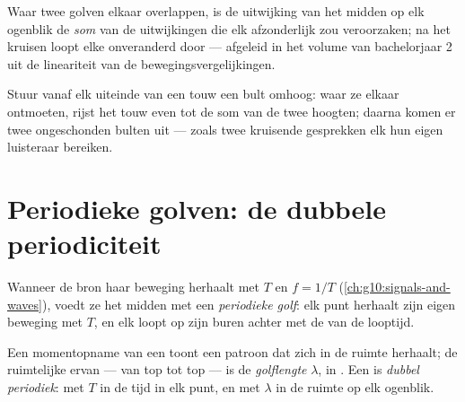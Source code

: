 \begin{proposition}\label{prop:g12:mechanical-waves:superposition}
Waar twee golven elkaar overlappen, is de uitwijking van het midden op elk
ogenblik de \emph{som} van de uitwijkingen die elk afzonderlijk zou
veroorzaken; na het kruisen loopt elke  onveranderd door --- afgeleid
in het volume van bachelorjaar 2 uit de lineariteit van de
bewegingsvergelijkingen. \admitted
\end{proposition}

\begin{example}\label{ex:g12:mechanical-waves:crossing}
Stuur vanaf elk uiteinde van een touw een bult omhoog: waar ze elkaar
ontmoeten, rijst het touw even tot de som van de twee hoogten; daarna
komen er twee ongeschonden bulten uit --- zoals twee kruisende gesprekken
elk hun eigen luisteraar bereiken.
\end{example}

\section{Periodieke golven: de dubbele periodiciteit}

\begin{definition}\label{def:g12:mechanical-waves:periodic}
Wanneer de bron haar beweging herhaalt met  $T$ en 
$f = 1/T$ (\cref{ch:g10:signals-and-waves}), voedt ze het midden met een
\emph{periodieke golf}: elk punt herhaalt zijn
eigen beweging met  $T$, en elk loopt op zijn buren achter met de
 van de looptijd.
\end{definition}

\begin{definition}[Golflengte]\label{def:g12:mechanical-waves:wavelength}
Een momentopname van een  toont een patroon dat zich in de
ruimte herhaalt; de ruimtelijke  ervan --- van top tot top --- is
de \emph{golflengte} $\lambda$, in . Een  is \emph{dubbel periodiek}: met 
$T$ in de tijd in elk punt, en met  $\lambda$ in de ruimte op elk
ogenblik.
\end{definition}

